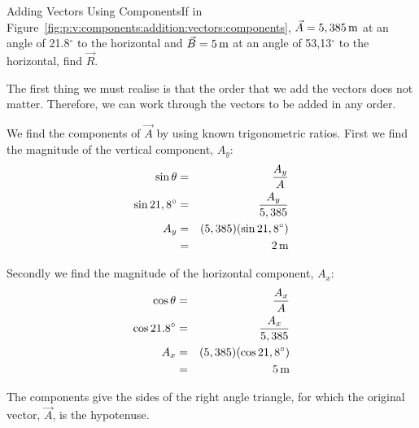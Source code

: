 \begin{wex}{Adding Vectors Using Components}{If in Figure~\ref{fig:p:v:components:addition:vectors:components}, $\vec{A}=5,385\,\rm{m}$ at an angle of 21.8$^\circ$ to the horizontal and $\vec{B}=5\,\rm{m}$ at an angle of 53,13$^\circ$ to the horizontal, find $\vec{R}$.\\}{
The first thing we must realise is that the order that we add the vectors does not matter. Therefore, we can work through the vectors to be added in any order.

We find the components of $\vec{A}$ by using known trigonometric ratios. First we find the magnitude of the vertical component, $A_y$:
\begin{eqnarray*}
\sin \theta &=& \frac{A_y}{A} \\
\sin{21,8^\circ} &=& \frac{A_y}{5,385}\\
A_y &=& (5,385)(\sin{21,8^\circ})\\
&=& 2\,\rm{m}
\end{eqnarray*}

Secondly we find the magnitude of the horizontal component, $A_x$:
\begin{eqnarray*}
\cos \theta &=& \frac{A_x}{A} \\
\cos{21.8^\circ} &=& \frac{A_x}{5,385}\\
A_x &=& (5,385) (\cos{21,8^\circ})\\
&=& 5\,\rm{m}
\end{eqnarray*}

\begin{center}
\end{center}

The components give the sides of the right angle triangle, for which the original vector, $\vec{A}$, is the hypotenuse.

}
\end{wex}
